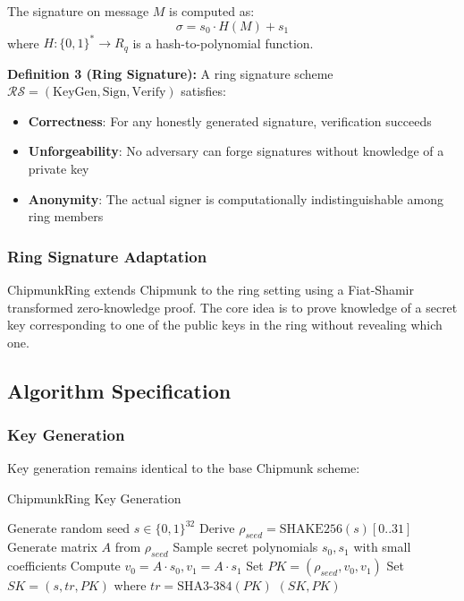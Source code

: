 \documentclass[11pt,a4paper]{article}
\begin{document}
The signature on message $M$ is computed as:
\begin{equation}
\sigma = s_0 \cdot H(M) + s_1
\end{equation}
where $H: \{0,1\}^* \rightarrow R_q$ is a hash-to-polynomial function.

\textbf{Definition 3 (Ring Signature):} A ring signature scheme $\mathcal{RS} = (\text{KeyGen}, \text{Sign}, \text{Verify})$ satisfies:
\begin{itemize}
\item \textbf{Correctness}: For any honestly generated signature, verification succeeds
\item \textbf{Unforgeability}: No adversary can forge signatures without knowledge of a private key
\item \textbf{Anonymity}: The actual signer is computationally indistinguishable among ring members
\end{itemize}

\subsubsection{Ring Signature Adaptation}

ChipmunkRing extends Chipmunk to the ring setting using a Fiat-Shamir transformed zero-knowledge proof. The core idea is to prove knowledge of a secret key corresponding to one of the public keys in the ring without revealing which one.

\subsection{Algorithm Specification}

\subsubsection{Key Generation}
Key generation remains identical to the base Chipmunk scheme:
\begin{algorithm}
\caption{ChipmunkRing Key Generation}
\begin{algorithmic}[1]
\STATE Generate random seed $s \in \{0,1\}^{32}$
\STATE Derive $\rho_{seed} = \text{SHAKE256}(s)[0..31]$
\STATE Generate matrix $A$ from $\rho_{seed}$
\STATE Sample secret polynomials $s_0, s_1$ with small coefficients
\STATE Compute $v_0 = A \cdot s_0, v_1 = A \cdot s_1$
\STATE Set $PK = (\rho_{seed}, v_0, v_1)$
\STATE Set $SK = (s, tr, PK)$ where $tr = \text{SHA3-384}(PK)$
\RETURN $(SK, PK)$
\end{algorithmic}
\end{algorithm}
\end{document}
